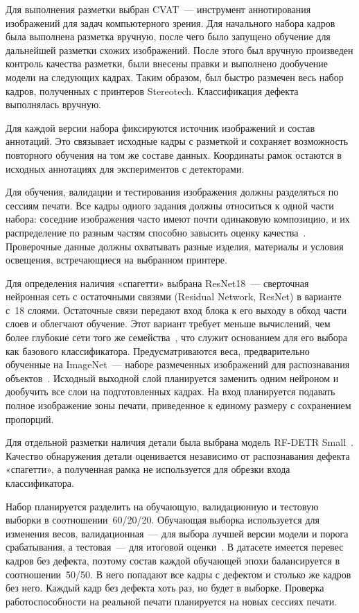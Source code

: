 Для выполнения разметки выбран CVAT~--- инструмент аннотирования изображений для задач компьютерного зрения. Для начального набора кадров была выполнена разметка вручную, после чего было запущено обучение для дальнейшей разметки схожих изображений. После этого был вручную произведен контроль качества разметки, были внесены правки и выполнено дообучение модели на следующих кадрах. Таким образом, был быстро размечен весь набор кадров, полученных с принтеров Stereotech. Классификация дефекта выполнялась вручную.

Для каждой версии набора фиксируются источник изображений и состав аннотаций. Это связывает исходные кадры с разметкой и сохраняет возможность повторного обучения на том же составе данных. Координаты рамок остаются в исходных аннотациях для экспериментов с детекторами.

Для обучения, валидации и тестирования изображения должны разделяться по сессиям печати. Все кадры одного задания должны относиться к одной части набора: соседние изображения часто имеют почти одинаковую композицию, и их распределение по разным частям способно завысить оценку качества~\cite{kapoor2023leakage}. Проверочные данные должны охватывать разные изделия, материалы и условия освещения, встречающиеся на выбранном принтере.

Для определения наличия «спагетти» выбрана ResNet18~--- сверточная нейронная сеть с остаточными связями (Residual Network, ResNet) в варианте с~18 слоями. Остаточные связи передают вход блока к его выходу в обход части слоев и облегчают обучение. Этот вариант требует меньше вычислений, чем более глубокие сети того же семейства~\cite{he2016deep}, что служит основанием для его выбора как базового классификатора. Предусматриваются веса, предварительно обученные на ImageNet~--- наборе размеченных изображений для распознавания объектов~\cite{deng2009imagenet}. Исходный выходной слой планируется заменить одним нейроном и дообучить все слои на подготовленных кадрах. На вход планируется подавать полное изображение зоны печати, приведенное к единому размеру с сохранением пропорций.

Для отдельной разметки наличия детали была выбрана модель RF-DETR Small~\cite{robinson2026rfdetr}. Качество обнаружения детали оценивается независимо от распознавания  дефекта «спагетти», а полученная рамка не используется для обрезки входа классификатора.

Набор планируется разделить на обучающую, валидационную и тестовую выборки в соотношении~60/20/20. Обучающая выборка используется для изменения весов, валидационная~--- для выбора лучшей версии модели и порога срабатывания, а тестовая~--- для итоговой оценки~\cite{гудфеллоу2017глубокое}. В датасете имеется перевес кадров без дефекта, поэтому состав каждой обучающей эпохи балансируется в соотношении~50/50. В него попадают все кадры с дефектом и столько же кадров без него. Каждый кадр без дефекта хоть раз, но будет в выборке. Проверка работоспособности на реальной печати планируется на новых сессиях печати.

